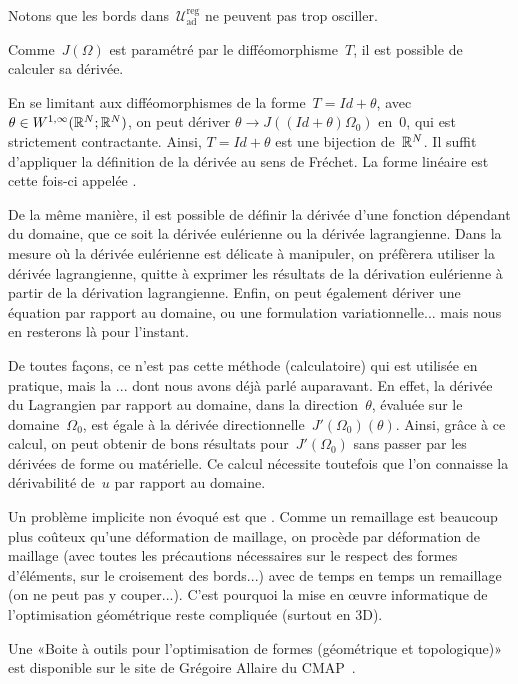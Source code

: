 Notons que les bords dans~$\mathscr{U}_{\text{ad}}^{\text{reg}}$ ne peuvent pas trop osciller.

\medskip
Comme~$J(\Omega)$ est paramétré par le difféomorphisme~$T$, il est possible de calculer sa dérivée.

En se limitant aux difféomorphismes de la forme~$T=Id+\theta$, avec~$\theta\in W^{1,\infty}(\mathbb R^N;\mathbb R^N)$, on peut dériver $\theta \rightarrow J((Id+\theta)\Omega_0)$ en~$0$, qui est strictement contractante. Ainsi, $T=Id+\theta$ est une bijection de~$\mathbb R^N$. Il suffit d'appliquer la définition de la dérivée au sens de Fréchet. La forme linéaire est cette fois-ci appelée .

De la même manière, il est possible de définir la dérivée d'une fonction dépendant du domaine, que ce soit la dérivée eulérienne ou la dérivée lagrangienne.
Dans la mesure où la dérivée eulérienne est délicate à manipuler, on préfèrera utiliser la dérivée lagrangienne, quitte à exprimer les résultats de la dérivation eulérienne à partir de la dérivation lagrangienne.
Enfin, on peut également dériver une équation par rapport au domaine, ou une formulation variationnelle... mais nous en resterons là pour l'instant.

De toutes façons, ce n'est pas cette méthode (calculatoire) qui est utilisée en pratique, mais la ... dont nous avons déjà parlé auparavant.
En effet, la dérivée du Lagrangien par rapport au domaine, dans la direction~$\theta$, évaluée sur le domaine~$\Omega_0$, est égale à la dérivée directionnelle~$J'(\Omega_0)(\theta)$.
Ainsi, grâce à ce calcul, on peut obtenir de bons résultats pour~$J'(\Omega_0)$ sans passer par les dérivées de forme ou matérielle. Ce calcul nécessite toutefois que l'on connaisse la dérivabilité de~$u$ par rapport au domaine.

\medskip
Un problème implicite non évoqué est que .
Comme un remaillage est beaucoup plus coûteux qu'une déformation de maillage, on procède par déformation de maillage (avec toutes les précautions nécessaires sur le respect des formes d'éléments, sur le croisement des bords...) avec de temps en temps un remaillage (on ne peut pas y couper...). C'est pourquoi la mise en œuvre informatique de l'optimisation géométrique reste compliquée (surtout en 3D).

Une «Boite à outils \freefem pour l'optimisation de formes (géométrique et topologique)» est disponible sur le site de Grégoire Allaire du CMAP~\cite{bib-AllaireOptimFF}.


